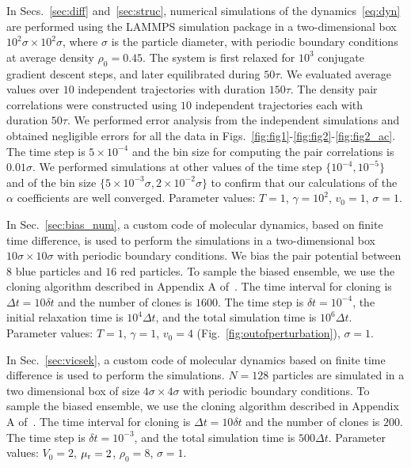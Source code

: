 \documentclass[superscriptaddress, twocolumn, prx, longbibliography, nofootinbib]{revtex4-1}
\begin{document}
In Secs.~\ref{sec:diff} and~\ref{sec:struc}, numerical simulations of the dynamics~\eqref{eq:dyn} are performed using the LAMMPS simulation package in a two-dimensional box $10^2\sigma\times 10^2\sigma$, where $\sigma$ is the particle diameter, with periodic boundary conditions at average density $\rho_0=0.45$. The system is first relaxed for $10^3$ conjugate gradient descent steps, and later equilibrated during $50\tau$. We evaluated average values over $10$ independent trajectories with duration $150\tau$. The density pair correlations were constructed using $10$ independent trajectories each with duration $50\tau$. We performed error analysis from the independent simulations and obtained negligible errors for all the data in Figs.~\ref{fig:fig1}-\ref{fig:fig2}-\ref{fig:fig2_ac}. The time step is $5\times 10^{-4}$ and the bin size for computing the pair correlations is $0.01 \sigma$. We performed simulations at other values of the time step $\{10^{-4},10^{-5}\}$ and of the bin size $\{5\times10^{-3} \sigma, 2\times10^{-2} \sigma\}$ to confirm that our calculations of the $\alpha$ coefficients are well converged. Parameter values: $T=1$, $\gamma=10^2$, $v_0=1$, $\sigma=1$. 


In Sec.~\ref{sec:bias_num}, a custom code of molecular dynamics, based on finite time difference, is used to perform the simulations in a two-dimensional box $10\sigma\times 10\sigma$ with periodic boundary conditions. We bias the pair potential between $8$ blue particles and $16$ red particles. To sample the biased ensemble, we use the cloning algorithm described in Appendix A of~\cite{Nemoto2016}. The time interval for cloning is $\Delta t = 10 \delta t$ and the number of clones is $1600$. The time step is $\delta t = 10^{-4}$, the initial relaxation time is $10^4\Delta t$, and the total simulation time is $10^6 \Delta t$. Parameter values: $T=1$, $\gamma=1$, $v_0=4$ (Fig.~\ref{fig:outofperturbation}), $\sigma=1$.


In Sec.~\ref{sec:vicsek}, a custom code of molecular dynamics based on finite time difference is used to perform the simulations. $N=128$ particles are simulated in a two dimensional box of size $4\sigma\times 4\sigma$ with periodic boundary conditions. To sample the biased ensemble, we use the cloning algorithm described in Appendix A of~\cite{Nemoto2016}. The time interval for cloning is $\Delta t = 10 \delta t$ and the number of clones is $200$. The time step is $\delta t = 10^{-3}$, and the total simulation time is $500 \Delta t$. Parameter values: $V_0=2$, $\mu_{\rm r}=2$, $\rho_0=8$, $\sigma=1$.
\end{document}
